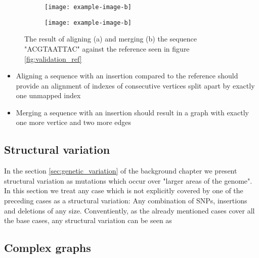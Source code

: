 \documentclass[thesis.tex]{subfiles}
\begin{document}
\begin{figure}[!h]
  \begin{subfigure}[t]{\textwidth}
    \texttt{[image: example-image-b]}
    \subcaption{}
  \end{subfigure}
  \begin{subfigure}[t]{\textwidth}
    \texttt{[image: example-image-b]}
    \subcaption{}
  \end{subfigure} 
  \caption{The result of aligning (a) and merging (b) the sequence "ACGTAATTAC" against the reference seen in figure \ref{fig:validation_ref}}
  \label{fig:validation_insertion}
\end{figure}
\begin{itemize}
  \item Aligning a sequence with an insertion compared to the reference should provide an alignment of indexes of consecutive vertices split apart by exactly one unmapped index
  \item Merging a sequence with an insertion should result in a graph with exactly one more vertice and two more edges
\end{itemize}
\subsection*{Structural variation}
In the section \ref{sec:genetic_variation} of the background chapter we present structural variation as mutations which occur over "larger areas of the genome". In this section we treat any case which is not explicitly covered by one of the preceding cases as a structural variation: Any combination of SNPs, insertions and deletions of any size. Conventiently, as the already mentioned cases cover all the base cases, any structural variation can be seen as 
\subsection*{Complex graphs}
\end{document}
